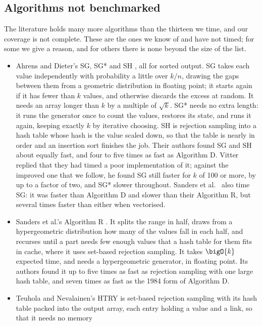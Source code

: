 \documentclass[letterpaper,11pt]{article}
\begin{document}
\subsection{Algorithms not benchmarked}\label{notbenchmarked}
The literature holds many more algorithms than the thirteen we time,
and our coverage is not complete. These are the ones we know of and
have not timed; for some we give a reason, and for others there is
none beyond the size of the list.

\begin{itemize}
\item Ahrens and Dieter's SG, SG* and SH \cite{ahrensd}, all for
sorted output. SG takes each value independently with probability a
little over \(k/n\), drawing the gaps between them from a geometric
distribution in floating point; it starts again if it has fewer than
\(k\) values, and otherwise discards the excess at random. It needs an
array longer than \(k\) by a multiple of \(\sqrt{k}\). SG* needs no
extra length: it runs the
generator once to count the values, restores its state, and runs it
again, keeping exactly \(k\) by iterative choosing. SH is rejection
sampling into a hash table whose hash is the value scaled down, so
that the table is nearly in order and an insertion sort finishes the
job. Their authors found SG and SH about equally fast, and four to
five times as fast as Algorithm D. Vitter \cite[\S 3]{vitterD} replied
that they had timed a poor implementation of it; against the improved
one that we follow, he found SG still faster for \(k\) of 100 or more,
by up to a factor of two, and SG* slower throughout. Sanders et al.\
\cite[\S 6]{sandersetal} also time SG: it was faster than Algorithm D
and slower than their Algorithm R, but several times faster than
either when vectorised.
\item Sanders et al.'s Algorithm R \cite[\S 3.1]{sandersetal}. It
splits the range in half, draws from a hypergeometric distribution how
many of the values fall in each half, and recurses until a part needs
few enough values that a hash table for them fits in cache, where it
uses set-based rejection sampling. It takes \(\bigO{k}\) expected
time, and needs a hypergeometric generator, in floating point. Its
authors found it up to five times as fast as rejection sampling with
one large hash table, and seven times as fast as the 1984 form of
Algorithm D.
\item Teuhola and Nevalainen's HTRY \cite{teuhola} is set-based
rejection sampling with its hash table packed into the output array,
each entry holding a value and a link, so that it needs no memory

\end{itemize}
\end{document}
